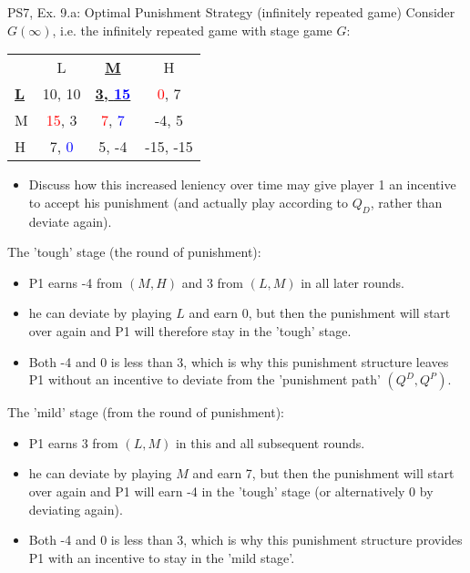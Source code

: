 \begin{frame}{PS7, Ex. 9.a: Optimal Punishment Strategy (infinitely repeated game)}
    Consider $G(\infty)$, i.e. the infinitely repeated game with stage game $G$: \vspace{-6pt}
    \begin{table}
      \begin{tabular}{l|c|c|c|}
        \multicolumn{1}{c}{} & \multicolumn{1}{c}{L} & \multicolumn{1}{c}{\textbf{\underline{M}}} & \multicolumn{1}{c}{H} \\\cline{2-4}
        \textbf{\underline{L}} & 10, 10 & \textbf{\underline{3, \textcolor{blue}{15}}} & \textcolor{red}{0}, 7 \\\cline{2-4}
        M & \textcolor{red}{15}, 3 & \textcolor{red}{7}, \textcolor{blue}{7} & -4, 5 \\\cline{2-4}
        H & 7, \textcolor{blue}{0} & 5, -4 & -15, -15 \\\cline{2-4}
      \end{tabular}
    \end{table}
    \vspace{-4pt}
    \begin{itemize}
      \item[(a)] Discuss how this increased leniency over time may give player 1 an incentive to accept his punishment (and actually play according to $Q_D$, rather than deviate again).
    \end{itemize}
    \vspace{-8pt}
  \begin{multicols}{2}
    The 'tough' stage (the  round of punishment):\vspace{-4pt}
    \begin{itemize}
      \item P1 earns -4 from $(M, H)$ and 3 from $(L, M)$ in all later rounds.
      \item he can deviate by playing $L$ and earn 0, but then the punishment will start over again and P1 will therefore stay in the 'tough' stage.
      \item Both -4 and 0 is less than 3, which is why this punishment structure leaves P1 without an incentive to deviate from the 'punishment path' $(Q^D,Q^P)$.
    \end{itemize}
    \vfill\null\columnbreak
    The 'mild' stage (from the  round of punishment):\vspace{-4pt}
    \begin{itemize}
      \item P1 earns 3 from $(L, M)$ in this and all subsequent rounds.
      \item he can deviate by playing $M$ and earn 7, but then the punishment will start over again and P1 will earn -4 in the 'tough' stage (or alternatively 0 by deviating again).
      \item Both -4 and 0 is less than 3, which is why this punishment structure provides P1 with an incentive to stay in the 'mild stage'.
    \end{itemize}
    \vfill\null
  \end{multicols}
\end{frame}

